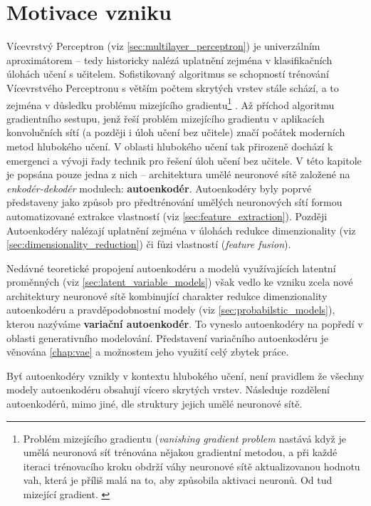 \section{Motivace vzniku}
Vícevrstvý Perceptron (viz \autoref{sec:multilayer_perceptron})
je univerzálním aproximátorem – tedy historicky nalézá uplatnění zejména v klasifikačních úlohách učení s učitelem.
Sofistikovaný algoritmus se schopností trénování Vícevrstvého Perceptronu s větším počtem skrytých vrstev stále schází, a to zejména v důsledku problému mizejícího gradientu\footnote{Problém mizejícího gradientu (\emph{vanishing gradient problem} nastává když je umělá neuronová síť trénována nějakou gradientní metodou, a při každé iteraci trénovacího kroku obdrží váhy neuronové sítě aktualizovanou hodnotu vah, která je příliš malá na to, aby způsobila aktivaci neuronů. Od tud mizející gradient. \cite{Hochreiter1998}} \cite{Hochreiter1998}.
Až příchod algoritmu gradientního sestupu, jenž řeší problém mizejícího gradientu v aplikacích konvolučních sítí \cite{LeCun1989} (a později i úloh učení bez učitele) značí počátek moderních metod hlubokého učení.
V oblasti hlubokého učení tak přirozeně dochází k emergenci a vývoji řady technik pro řešení úloh učení bez učitele.
V této kapitole je popsána pouze jedna z nich – architektura umělé neuronové sítě založené na \emph{enkodér-dekodér} modulech: \textbf{autoenkodér}.
Autoenkodéry byly poprvé představeny jako způsob pro předtrénování umělých neuronových sítí formou automatizované extrakce vlastností (viz \autoref{sec:feature_extraction}). 
Později Autoenkodéry nalézají uplatnění zejména v úlohách redukce dimenzionality (viz \autoref{sec:dimensionality_reduction}) či fůzi vlastností (\emph{feature fusion}). \cite{Charte2018}


Nedávné teoretické propojení autoenkodéru a modelů využívajících latentní proměnných (viz \autoref{sec:latent_variable_models}) však vedlo ke vzniku zcela nové architektury neuronové sítě kombinující charakter redukce dimenzionality autoenkodéru a pravděpodobnostní modely (viz \autoref{sec:probabilstic_models}), kterou nazýváme \textbf{variační autoenkodér}.
To vyneslo autoenkodéry na popředí v oblasti generativního modelování. Představení variačního autoenkodéru je věnována \autoref{chap:vae} a možnostem jeho využití celý zbytek práce.

Byť autoenkodéry vznikly v kontextu hlubokého učení, není pravidlem že všechny modely autoenkodéru obsahují vícero skrytých vrstev. Následuje rozdělení autoenkodérů, mimo jiné, dle struktury jejich umělé neuronové sítě.
